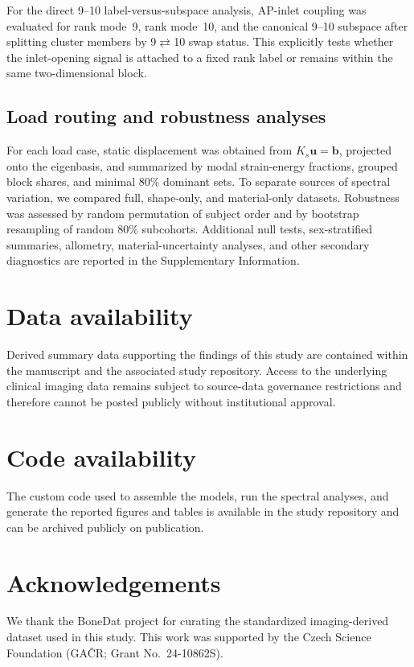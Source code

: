 \documentclass[11pt]{article}
\begin{document}
For the direct 9--10 label-versus-subspace analysis, AP-inlet coupling was evaluated for rank mode~9, rank mode~10, and the canonical 9--10 subspace after splitting cluster members by 9$\rightleftarrows$10 swap status.
This explicitly tests whether the inlet-opening signal is attached to a fixed rank label or remains within the same two-dimensional block.

\subsection{Load routing and robustness analyses}

For each load case, static displacement was obtained from $K_s\mathbf u = \mathbf b$, projected onto the eigenbasis, and summarized by modal strain-energy fractions, grouped block shares, and minimal 80\% dominant sets.
To separate sources of spectral variation, we compared full, shape-only, and material-only datasets.
Robustness was assessed by random permutation of subject order and by bootstrap resampling of random 80\% subcohorts.
Additional null tests, sex-stratified summaries, allometry, material-uncertainty analyses, and other secondary diagnostics are reported in the Supplementary Information.

\section*{Data availability}
Derived summary data supporting the findings of this study are contained within the manuscript and the associated study repository.
Access to the underlying clinical imaging data remains subject to source-data governance restrictions and therefore cannot be posted publicly without institutional approval.

\section*{Code availability}
The custom code used to assemble the models, run the spectral analyses, and generate the reported figures and tables is available in the study repository and can be archived publicly on publication.

\section*{Acknowledgements}
We thank the BoneDat project for curating the standardized imaging-derived dataset used in this study.
This work was supported by the Czech Science Foundation (GA\v{C}R; Grant No.\ 24-10862S).
\end{document}
